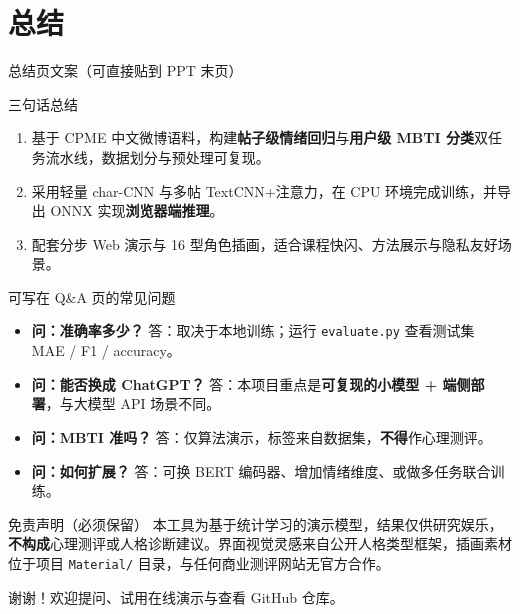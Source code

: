 \section{总结}

\begin{frame}[allowframebreaks]{总结页文案（可直接贴到 PPT 末页）}
    \small
    \begin{block}{三句话总结}
        \begin{enumerate}
            \item 基于 CPME 中文微博语料，构建\textbf{帖子级情绪回归}与\textbf{用户级 MBTI 分类}双任务流水线，数据划分与预处理可复现。
            \item 采用轻量 char-CNN 与多帖 TextCNN+注意力，在 CPU 环境完成训练，并导出 ONNX 实现\textbf{浏览器端推理}。
            \item 配套分步 Web 演示与 16 型角色插画，适合课程快闪、方法展示与隐私友好场景。
        \end{enumerate}
    \end{block}

    \vspace{0.4em}
    \begin{block}{可写在 Q\&A 页的常见问题}
        \begin{itemize}
            \item \textbf{问：准确率多少？} 答：取决于本地训练；运行 \texttt{evaluate.py} 查看测试集 MAE / F1 / accuracy。
            \item \textbf{问：能否换成 ChatGPT？} 答：本项目重点是\textbf{可复现的小模型 + 端侧部署}，与大模型 API 场景不同。
            \item \textbf{问：MBTI 准吗？} 答：仅算法演示，标签来自数据集，\textbf{不得}作心理测评。
            \item \textbf{问：如何扩展？} 答：可换 BERT 编码器、增加情绪维度、或做多任务联合训练。
        \end{itemize}
    \end{block}

    \vspace{0.4em}
    \begin{alertblock}{免责声明（必须保留）}
        本工具为基于统计学习的演示模型，结果仅供研究娱乐，\textbf{不构成}心理测评或人格诊断建议。界面视觉灵感来自公开人格类型框架，插画素材位于项目 \texttt{Material/} 目录，与任何商业测评网站无官方合作。
    \end{alertblock}

    \vspace{0.6em}
    \centering
    {\Large 谢谢！欢迎提问、试用在线演示与查看 GitHub 仓库。}
\end{frame}

